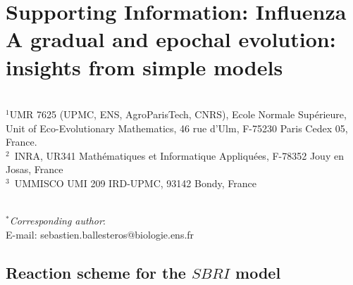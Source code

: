 \chapter{Supporting Information: Influenza A gradual and
  epochal evolution: insights from simple models}

\author{Sébastien Ballesteros$^{1,*}$, Elisabeta Vergu$^{2}$, Bernard
  Cazelles$^{1,3}$}



~ \\
$^1$UMR 7625  (UPMC, ENS, AgroParisTech, CNRS), Ecole Normale Supérieure, Unit of Eco-Evolutionary Mathematics,  46 rue d'Ulm, F-75230 Paris Cedex 05, France. \\
$^2$~INRA, UR341 Mathématiques et Informatique Appliquées, F-78352 Jouy en Josas, France \\
$^3$~UMMISCO UMI 209 IRD-UPMC, 93142 Bondy, France

~ \\
$^*$\textit{Corresponding author}:  \\
E-mail: sebastien.ballesteros@biologie.ens.fr

\section{Reaction scheme for the $SBRI$ model}

